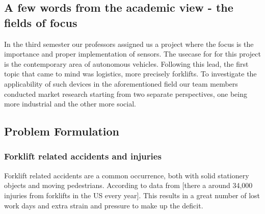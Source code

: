 \documentclass[../report.tex]{subfiles}
\begin{document}





    \subsection{A few words from the academic view - the fields of focus}
    In the third semester our professors assigned us a project where
    the focus is the importance and proper implementation of sensors. The usecase for
    for this project is the contemporary area of autonomous vehicles. Following this lead, the first
    topic that came to mind was logistics, more precisely forklifts.
    To investigate the applicability of such devices in the 
    aforementioned field our team members conducted market research 
    starting from two separate perspectives, one being more 
    industrial and the other more social.


    \subsection{Problem Formulation}
    \subsubsection{Forklift related accidents and injuries}
    Forklift related accidents are a common occurrence, both with solid
    stationery objects and moving pedestrians. According to data from \cite{fork_injuries}[there a around 34,000 injuries from forklifts in the US every year]. This
    results in a great number of lost work days and extra strain and 
    pressure to make up the deficit.
\end{document}
